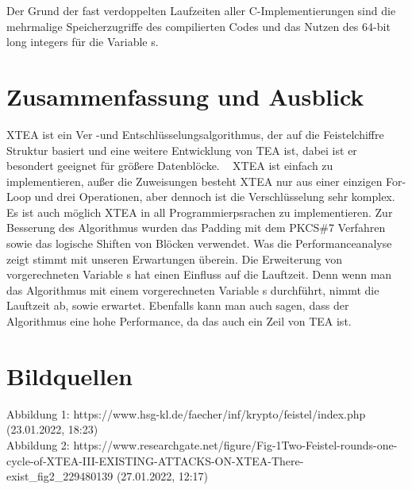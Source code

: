 \documentclass[course=asp]{aspdoc}
\begin{document}
Der Grund der fast verdoppelten Laufzeiten aller C-Implementierungen sind die mehrmalige Speicherzugriffe des compilierten
Codes und das Nutzen des 64-bit long integers für die Variable s.

\section{Zusammenfassung und Ausblick}
XTEA ist ein Ver -und Entschlüsselungsalgorithmus, der auf die Feistelchiffre Struktur basiert und eine weitere Entwicklung von TEA ist, dabei ist er besondert geeignet für größere Datenblöcke. ~\cite{appel2016sicherheitsaspekte}
XTEA ist einfach zu implementieren, außer die Zuweisungen besteht XTEA nur aus einer einzigen For-Loop und drei Operationen, aber dennoch ist die Verschlüsselung sehr komplex. Es ist auch möglich XTEA in all Programmierpsrachen zu implementieren.
Zur Besserung des Algorithmus wurden das Padding mit dem PKCS\#7 Verfahren sowie das logische Shiften von Blöcken verwendet.
Was die Performanceanalyse zeigt stimmt mit unseren Erwartungen überein. Die Erweiterung von vorgerechneten Variable s hat einen Einfluss auf die Lauftzeit. Denn wenn man das Algorithmus mit einem vorgerechneten Variable s durchführt, nimmt die Lauftzeit ab, sowie erwartet. Ebenfalls kann man auch sagen, dass der Algorithmus eine hohe Performance, da das auch ein Zeil von TEA ist. ~\cite{appel2016sicherheitsaspekte}

\newpage
\section{Bildquellen}
Abbildung 1: https://www.hsg-kl.de/faecher/inf/krypto/feistel/index.php (23.01.2022, 18:23) \\
Abbildung 2: https://www.researchgate.net/figure/Fig-1Two-Feistel-rounds-one-cycle-of-XTEA-III-EXISTING-ATTACKS-ON-XTEA-There-exist\_fig2\_229480139 (27.01.2022, 12:17)\\


{}
\end{document}
